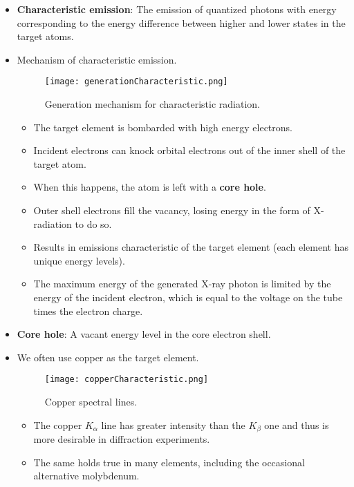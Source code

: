 \documentclass[../notes.tex]{subfiles}
\begin{document}
\begin{itemize}
\begin{itemize}
    \end{itemize}
    \item \textbf{Characteristic emission}: The emission of quantized photons with energy corresponding to the energy difference between higher and lower states in the target atoms.
    \item Mechanism of characteristic emission.
    \begin{figure}[h!]
        \centering
        \texttt{[image: generationCharacteristic.png]}
        \caption{Generation mechanism for characteristic radiation.}
        \label{fig:generationCharacteristic}
    \end{figure}
    \begin{itemize}
        \item The target element is bombarded with high energy electrons.
        \item Incident electrons can knock orbital electrons out of the inner shell of the target atom.
        \item When this happens, the atom is left with a \textbf{core hole}.
        \item Outer shell electrons fill the vacancy, losing energy in the form of X-radiation to do so.
        \item Results in emissions characteristic of the target element (each element has unique energy levels).
        \item The maximum energy of the generated X-ray photon is limited by the energy of the incident electron, which is equal to the voltage on the tube times the electron charge.
    \end{itemize}
    \item \textbf{Core hole}: A vacant energy level in the core electron shell.
    \item We often use copper as the target element.
    \begin{figure}[H]
        \centering
        \texttt{[image: copperCharacteristic.png]}
        \caption{Copper spectral lines.}
        \label{fig:copperCharacteristic}
    \end{figure}
    \begin{itemize}
        \item The copper $K_\alpha$ line has greater intensity than the $K_\beta$ one and thus is more desirable in diffraction experiments.
        \item The same holds true in many elements, including the occasional alternative molybdenum.
    \end{itemize}

\end{itemize}
\end{document}
